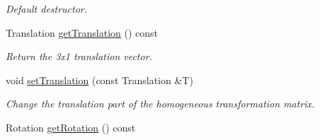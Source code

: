 \begin{DoxyCompactItemize}
\begin{DoxyCompactList}\small\item\em Default destructor. \end{DoxyCompactList}\item 
\hypertarget{class_homogeneous_transform_ad17be374a7db399b4cf95aa92c998dd1}{Translation \hyperlink{class_homogeneous_transform_ad17be374a7db399b4cf95aa92c998dd1}{get\+Translation} () const }\label{class_homogeneous_transform_ad17be374a7db399b4cf95aa92c998dd1}

\begin{DoxyCompactList}\small\item\em Return the 3x1 translation vector. \end{DoxyCompactList}\item 
void \hyperlink{class_homogeneous_transform_ae3ee4526c97a7b8f66a28b1f8ce50064}{set\+Translation} (const Translation \&T)
\begin{DoxyCompactList}\small\item\em Change the translation part of the homogeneous transformation matrix. \end{DoxyCompactList}\item 
\hypertarget{class_homogeneous_transform_a797c18c0b9ca86386ad41c796930b84d}{Rotation \hyperlink{class_homogeneous_transform_a797c18c0b9ca86386ad41c796930b84d}{get\+Rotation} () const }\label{class_homogeneous_transform_a797c18c0b9ca86386ad41c796930b84d}


\end{DoxyCompactItemize}
